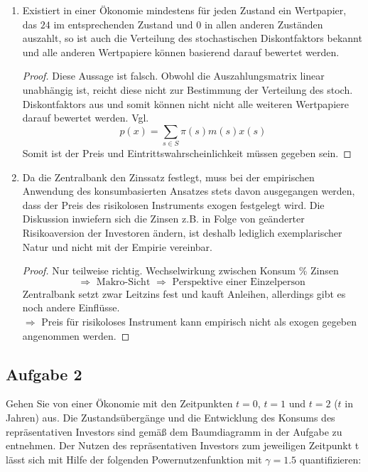 \documentclass[12pt]{extreport} %
\theoremstyle{named}
\theoremstyle{nnamed}
\theoremstyle{itshape}
\theoremstyle{normal}
\begin{document}
\begin{enumerate}
\begin{proof}
		\end{proof}
	\item Existiert in einer Ökonomie mindestens für jeden Zustand ein Wertpapier, das $24$ im entsprechenden Zustand und $0$ in allen anderen Zuständen auszahlt, so ist auch die Verteilung des stochastischen Diskontfaktors bekannt und alle anderen Wertpapiere können basierend darauf bewertet werden.
		\begin{proof}
			Diese Aussage ist falsch. Obwohl die Auszahlungsmatrix linear unabhängig ist, reicht diese nicht zur Bestimmung der Verteilung des stoch. Diskontfaktors aus und somit können nicht nicht alle weiteren Wertpapiere darauf bewertet werden. Vgl.
			$$ p(x) = \sum_{s \in S} \pi(s) m(s) x(s) $$
			Somit ist der Preis und Eintrittswahrscheinlichkeit müssen gegeben sein.
		\end{proof}
	\item  Da die Zentralbank den Zinssatz festlegt, muss bei der empirischen Anwendung des konsumbasierten Ansatzes stets davon ausgegangen werden, dass der Preis des risikolosen Instruments exogen festgelegt wird. Die Diskussion inwiefern sich die Zinsen z.B. in Folge von geänderter Risikoaversion der Investoren ändern, ist deshalb lediglich exemplarischer Natur und nicht mit der Empirie vereinbar. 
		\begin{proof}
			Nur teilweise richtig. Wechselwirkung zwischen Konsum \% Zinsen
				$$ \Rightarrow \text{ Makro-Sicht } \Rightarrow \text{ Perspektive einer Einzelperson } $$
				Zentralbank setzt zwar Leitzins fest und kauft Anleihen, allerdings gibt es noch andere Einflüsse. ~\\
			$\Rightarrow$ Preis für risikoloses Instrument kann empirisch nicht als exogen gegeben angenommen werden.
		\end{proof}
\end{enumerate}

\newpage

\subsection*{Aufgabe 2}
Gehen Sie von einer Ökonomie mit den Zeitpunkten $t = 0$, $t = 1$ und $t = 2$ ($t$ in Jahren) aus. Die Zustandsübergänge und die Entwicklung des Konsums des repräsentativen Investors sind gemäß dem Baumdiagramm in der Aufgabe zu entnehmen. Der Nutzen des repräsentativen Investors zum jeweiligen Zeitpunkt t lässt sich mit Hilfe der folgenden Powernutzenfunktion mit $\gamma = 1.5$ quantifizieren:
\end{document}
